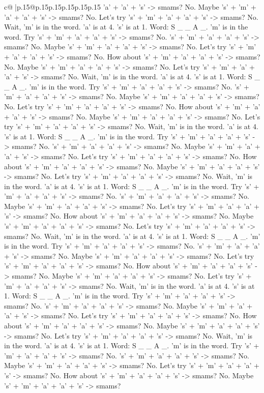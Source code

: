 \documentclass{article}
\begin{document}
{\begin{supertabular}{c@{$\;$}|p{.15\linewidth}@{}p{.15\linewidth}p{.15\linewidth}p{.15\linewidth}p{.15\linewidth}p{.15\linewidth}}
{{{'a' + 'a' + 's' {-}> smams? No. Maybe 's' + 'm' + 'a' + 'a' + 's' {-}> smams? No. Let's try 's' + 'm' + 'a' + 'a' + 's' {-}> smams? No. Wait, 'm' is in the word. 'a' is at 4. 's' is at 1. Word: S \_ \_ A \_. 'm' is in the word. Try 's' + 'm' + 'a' + 'a' + 's' {-}> smams? No. 's' + 'm' + 'a' + 'a' + 's' {-}> smams? No. Maybe 's' + 'm' + 'a' + 'a' + 's' {-}> smams? No. Let's try 's' + 'm' + 'a' + 'a' + 's' {-}> smams? No. How about 's' + 'm' + 'a' + 'a' + 's' {-}> smams? No. Maybe 's' + 'm' + 'a' + 'a' + 's' {-}> smams? No. Let's try 's' + 'm' + 'a' + 'a' + 's' {-}> smams? No. Wait, 'm' is in the word. 'a' is at 4. 's' is at 1. Word: S \_ \_ A \_. 'm' is in the word. Try 's' + 'm' + 'a' + 'a' + 's' {-}> smams? No. 's' + 'm' + 'a' + 'a' + 's' {-}> smams? No. Maybe 's' + 'm' + 'a' + 'a' + 's' {-}> smams? No. Let's try 's' + 'm' + 'a' + 'a' + 's' {-}> smams? No. How about 's' + 'm' + 'a' + 'a' + 's' {-}> smams? No. Maybe 's' + 'm' + 'a' + 'a' + 's' {-}> smams? No. Let's try 's' + 'm' + 'a' + 'a' + 's' {-}> smams? No. Wait, 'm' is in the word. 'a' is at 4. 's' is at 1. Word: S \_ \_ A \_. 'm' is in the word. Try 's' + 'm' + 'a' + 'a' + 's' {-}> smams? No. 's' + 'm' + 'a' + 'a' + 's' {-}> smams? No. Maybe 's' + 'm' + 'a' + 'a' + 's' {-}> smams? No. Let's try 's' + 'm' + 'a' + 'a' + 's' {-}> smams? No. How about 's' + 'm' + 'a' + 'a' + 's' {-}> smams? No. Maybe 's' + 'm' + 'a' + 'a' + 's' {-}> smams? No. Let's try 's' + 'm' + 'a' + 'a' + 's' {-}> smams? No. Wait, 'm' is in the word. 'a' is at 4. 's' is at 1. Word: S \_ \_ A \_. 'm' is in the word. Try 's' + 'm' + 'a' + 'a' + 's' {-}> smams? No. 's' + 'm' + 'a' + 'a' + 's' {-}> smams? No. Maybe 's' + 'm' + 'a' + 'a' + 's' {-}> smams? No. Let's try 's' + 'm' + 'a' + 'a' + 's' {-}> smams? No. How about 's' + 'm' + 'a' + 'a' + 's' {-}> smams? No. Maybe 's' + 'm' + 'a' + 'a' + 's' {-}> smams? No. Let's try 's' + 'm' + 'a' + 'a' + 's' {-}> smams? No. Wait, 'm' is in the word. 'a' is at 4. 's' is at 1. Word: S \_ \_ A \_. 'm' is in the word. Try 's' + 'm' + 'a' + 'a' + 's' {-}> smams? No. 's' + 'm' + 'a' + 'a' + 's' {-}> smams? No. Maybe 's' + 'm' + 'a' + 'a' + 's' {-}> smams? No. Let's try 's' + 'm' + 'a' + 'a' + 's' {-}> smams? No. How about 's' + 'm' + 'a' + 'a' + 's' {-}> smams? No. Maybe 's' + 'm' + 'a' + 'a' + 's' {-}> smams? No. Let's try 's' + 'm' + 'a' + 'a' + 's' {-}> smams? No. Wait, 'm' is in the word. 'a' is at 4. 's' is at 1. Word: S \_ \_ A \_. 'm' is in the word. Try 's' + 'm' + 'a' + 'a' + 's' {-}> smams? No. 's' + 'm' + 'a' + 'a' + 's' {-}> smams? No. Maybe 's' + 'm' + 'a' + 'a' + 's' {-}> smams? No. Let's try 's' + 'm' + 'a' + 'a' + 's' {-}> smams? No. How about 's' + 'm' + 'a' + 'a' + 's' {-}> smams? No. Maybe 's' + 'm' + 'a' + 'a' + 's' {-}> smams? No. Let's try 's' + 'm' + 'a' + 'a' + 's' {-}> smams? No. Wait, 'm' is in the word. 'a' is at 4. 's' is at 1. Word: S \_ \_ A \_. 'm' is in the word. Try 's' + 'm' + 'a' + 'a' + 's' {-}> smams? No. 's' + 'm' + 'a' + 'a' + 's' {-}> smams? No. Maybe 's' + 'm' + 'a' + 'a' + 's' {-}> smams? No. Let's try 's' + 'm' + 'a' + 'a' + 's' {-}> smams? No. How about 's' + 'm' + 'a' + 'a' + 's' {-}> smams? No. Maybe 's' + 'm' + 'a' + 'a' + 's' {-}> smams? }}}
\end{supertabular}}
\end{document}
